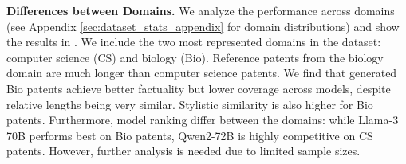 \noindent\textbf{Differences between Domains. }
We analyze the performance across domains (see Appendix \ref{sec:dataset_stats_appendix} for domain distributions) and show the results in .
We include the two most represented domains in the dataset: computer science (CS) and biology (Bio).
Reference patents from the biology domain are much longer than computer science patents.
We find that generated Bio patents achieve better factuality but lower coverage across models, despite relative lengths being very similar.
Stylistic similarity is also higher for Bio patents.
Furthermore, model ranking differ between the domains: while Llama-3 70B performs best on Bio patents, Qwen2-72B is highly competitive on CS patents.
However, further analysis is needed due to limited sample sizes.


\FloatBarrier